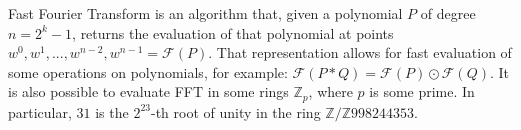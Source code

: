 Fast Fourier Transform is an algorithm that, given a polynomial $P$ of degree $n = 2^k - 1$, returns the evaluation of that polynomial at points $w^0, w^1, ..., w^{n - 2}, w^{n - 1} = \mathcal{F}(P)$. That representation allows for fast evaluation of some operations on polynomials, for example: $\mathcal{F}(P \ast Q) = \mathcal{F}(P) \odot \mathcal{F}(Q)$. It is also possible to evaluate FFT in some rings $\mathbb{Z}_p$, where $p$ is some prime. In particular, $31$ is the $2^{23}$-th root of unity in the ring $\mathbb{Z}/\mathbb{Z}{998244353}$.


